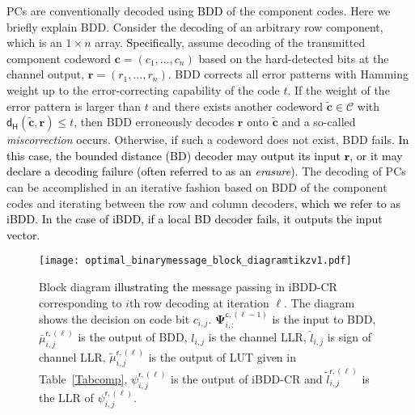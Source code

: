 \documentclass[journal]{IEEEtran}
\newcommand{\row}{\mathsf{r}}
\newcommand{\nc}{n}
\newcommand{\kc}{k}
\newcommand{\lr}{\boldsymbol{r}}
\newcommand{\lc}{\boldsymbol{c}}
\newcommand{\rbol}{\boldsymbol{r}}
\newcommand{\dmin}{d_\mathsf{min}}
\newcommand{\ham}{\mathsf{d}_\mathsf{H}}
\newcommand{\GL}{\textcolor{black}}
\newcommand{\AG}{\textcolor{black}}
\newcommand\scalemath[2]{\scalebox{#1}{\mbox{\ensuremath{\displaystyle #2}}}}   %
\begin{document}
PCs are conventionally decoded using \AG{BDD} of the component codes. Here we briefly explain BDD. Consider the decoding of an arbitrary row component, which is an $1 \times n$ array. \AG{Specifically}, assume decoding of the transmitted component codeword $\lc=(c_1,\ldots,c_{\nc})$ based on the hard-detected bits at the channel output,
$\lr=(r_1,\ldots,r_{\nc})$. BDD corrects all
error patterns with Hamming weight up to the error-correcting
capability of the code $t$. If the
weight of the error pattern is larger than $t$ and there exists
another codeword $\tilde{\lc} \in \mathcal{C}$ with
$\mathsf{d_H}(\tilde{\lc},\lr)\le t$, then BDD erroneously decodes $\lr$ onto
$\tilde{\lc}$ and a so-called \emph{miscorrection} \AG{occurs}.  Otherwise, if
such a codeword does not exist, BDD fails. \GL{\AG{In this case, the bounded distance (BD) decoder}  may output its input $\lr$, or it may declare a decoding failure (often referred to as an \emph{erasure}).}
The decoding of PCs can be accomplished in an iterative fashion based on  BDD of the component codes and iterating between the row and column decoders, \AG{which we refer to as iBDD}. \GL{In the case of iBDD, if a local \AG{BD decoder} fails, it outputs the input vector.}
 
\begin{figure*}[!t] \centering 
	\texttt{[image: optimal\_binarymessage\_block\_diagramtikzv1.pdf]}  
	\caption{Block diagram \GL{illustrating the} message passing in iBDD-CR corresponding to $i$th row decoding at iteration $\ell$. The diagram shows the decision on code bit $c_{i,j}$. $\bm{\Psi}_{i,:}^{\mathsf{c},(\ell-1)}$ is the input to BDD, $\bar \mu^{\row,(\ell)}_{i,j}$ is the output of BDD, $l_{i,j}$ is the channel LLR, $\hat l_{i,j}$ is sign of channel LLR, $\tilde \mu^{\row,(\ell)}_{i,j}$ is the output of LUT given in Table~\ref{Tabcomp}, $\psi^{\row,(\ell)}_{i,j}$ is the output of iBDD-CR  and $\tilde l^{\row,(\ell)}_{i,j}$ is the LLR of $\psi^{\row,(\ell)}_{i,j}$.}  %
	\label{SysPCCST} 
\end{figure*} 
\end{document}
